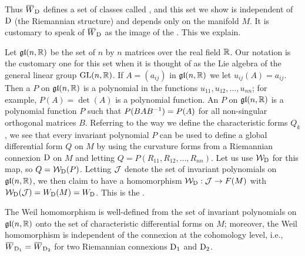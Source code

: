 \documentclass[../main]{subfiles}
\begin{document}
Thus $\xoverline{W}_\connection$ defines a set of classes called , and this set we show is independent of $\mathrm{D}$ (the Riemannian structure) and depends only on the manifold $M$. It is customary to speak of $\xoverline{W}_\connection$ as the image of the . This we explain.

Let $\mathfrak{gl}(n,\mathbb{R})$ be the set of $n$ by $n$ matrices over the real field $\mathbb{R}$. Our notation is the customary one for this set when it is thought of as the Lie algebra of the general linear group $\mathrm{GL}(n,\mathbb{R})$. If $A=(a_{ij})$ in $\mathfrak{gl}(n,\mathbb{R})$ we let $u_{i j}(A)=a_{i j}$. Then a  $P$ on $\mathfrak{gl}(n,\mathbb{R})$ is a polynomial in the functions $u_{11}, u_{12}, \dots, u_{n n}$; for example, $P(A)=\det(A)$ is a polynomial function. An  $P$ on $\mathfrak{gl}(n,\mathbb{R})$ is a polynomial function $P$ such that $P(B A B^{-1})=P(A)$ for all non-singular orthogonal matrices $B$. Referring to the way we define the characteristic forms $Q_k$, we see that every invariant polynomial $P$ can be used to define a global differential form $Q$ on $M$ by using the curvature forms from a Riemannian connexion $\mathrm{D}$ on $M$ and letting $Q=P(R_{11}, R_{12}, \dots, R_{nn})$. Let us use ${\cal W}_{\mathrm{D}}$ for this map, so $Q={\cal W}_{\mathrm{D}}(P)$. Letting ${\cal J}$ denote the set of invariant polynomials on $\mathfrak{gl}(n,\mathbb{R})$, we then claim to have a homomorphism ${\cal W}_{\mathrm{D}}: {\cal J}\to F(M)$ with ${\cal W}_{\mathrm{D}}({\cal J})=W_{\mathrm{D}}(M)=W_{\mathrm{D}}$. This is the .



\begin{theorem} \label{thm:ch8.4.2}
The Weil homomorphism is well-defined from the set of invariant polynomials on $\mathfrak{gl}(n,\mathbb{R})$ onto the set of characteristic differential forms on $M$; moreover, the Weil homomorphism is independent of the connexion at the cohomology level, i.e., $\xoverline{W}_{\connection_1}=\xoverline{W}_{\connection_2}$ for two Riemannian connexions $\mathrm{D}_1$ and $\mathrm{D}_2$.
\end{theorem}
\end{document}
